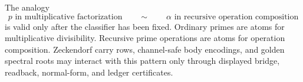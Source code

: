 \begin{principle}
\label{prin:axiszeckendorf-classifier-relative-primeness}
The analogy
$$
p\text{ in multiplicative factorization}
\qquad\sim\qquad
\alpha\text{ in recursive operation composition}
$$
is valid only after the classifier has been fixed.  Ordinary primes are
atoms for multiplicative divisibility.  Recursive prime operations are
atoms for operation composition.  Zeckendorf carry rows, channel-safe
body encodings, and golden spectral roots may interact with this pattern
only through displayed bridge, readback, normal-form, and ledger
certificates.
\end{principle}

